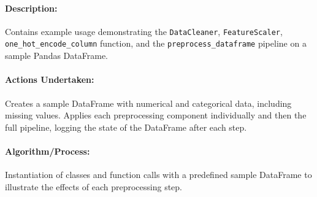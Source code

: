 \documentclass{article}
\begin{document}
\paragraph{Description:} Contains example usage demonstrating the \texttt{DataCleaner}, \texttt{FeatureScaler}, \texttt{one\_hot\_encode\_column} function, and the \texttt{preprocess\_dataframe} pipeline on a sample Pandas DataFrame.
\paragraph{Actions Undertaken:} Creates a sample DataFrame with numerical and categorical data, including missing values. Applies each preprocessing component individually and then the full pipeline, logging the state of the DataFrame after each step.
\paragraph{Algorithm/Process:} Instantiation of classes and function calls with a predefined sample DataFrame to illustrate the effects of each preprocessing step.
\end{document}
